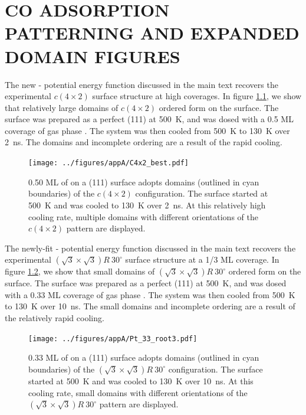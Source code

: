 
\chapter{CO ADSORPTION PATTERNING AND EXPANDED DOMAIN FIGURES}
\label{app:SI}

The new - potential energy function discussed in the
main text recovers the experimental $c(4 \times 2)$ surface structure
at high coverages.  In figure \ref{fig:C4x2}, we show that relatively
large domains of $c(4 \times 2)$ ordered  form on the surface.
The surface was prepared as a perfect (111) at 500~K, and was
dosed with a 0.5 ML coverage of gas phase .  The system was
then cooled from 500~K to 130~K over 2~ns.  The domains and incomplete
ordering are a result of the rapid cooling.

\begin{figure}
  \texttt{[image: ../figures/appA/C4x2\_best.pdf]}
  \caption{0.50 ML of  on a (111) surface adopts domains
    (outlined in cyan boundaries) of the $c(4 \times 2)$
    configuration. The surface started at 500~K and was cooled to
    130~K over 2~ns.  At this relatively high cooling rate, multiple
    domains with different orientations of the $c(4 \times 2)$ pattern
    are displayed.}
\label{fig:C4x2}
\end{figure}

\newpage

The newly-fit - potential energy function discussed in
the main text recovers the experimental
$(\sqrt{3} \times \sqrt{3}) R~30^{\circ}$ surface structure at a 1/3
ML coverage.  In figure \ref{fig:Root3}, we show that small domains of
$(\sqrt{3} \times \sqrt{3}) R~30^{\circ}$ ordered  form on the
surface.  The surface was prepared as a perfect (111) at 500~K,
and was dosed with a 0.33 ML coverage of gas phase .  The
system was then cooled from 500~K to 130~K over 10~ns.  The small
domains and incomplete ordering are a result of the relatively rapid
cooling.

\begin{figure}
  \texttt{[image: ../figures/appA/Pt\_33\_root3.pdf]}
  \caption{0.33 ML of  on a (111) surface adopts domains
    (outlined in cyan boundaries) of the
    $(\sqrt{3} \times \sqrt{3}) R~30^{\circ}$ configuration. The
    surface started at 500~K and was cooled to 130~K over 10~ns.  At
    this cooling rate, small domains with different orientations of
    the $(\sqrt{3} \times \sqrt{3}) R~30^{\circ}$ pattern are
    displayed.}
\label{fig:Root3}
\end{figure}

